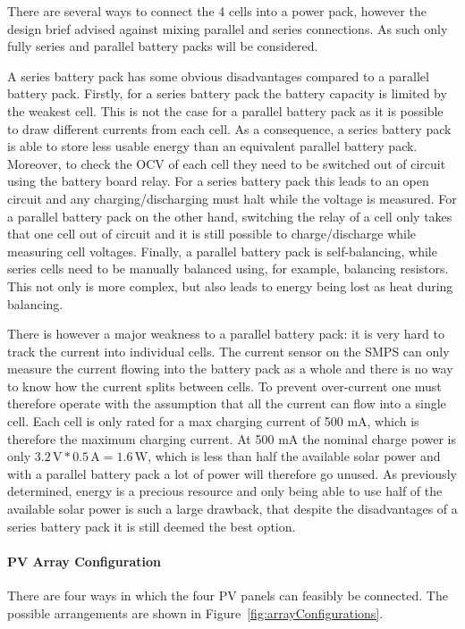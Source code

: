 \documentclass[a4paper]{article}
\newcommand{\unit}[1]{\ensuremath{\, \mathrm{#1}}}
\begin{document}
There are several ways to connect the 4 cells into a power pack, 
however the design brief advised against mixing parallel and series 
connections\cite{energyBrief}. As such only fully series and parallel 
battery packs will be considered. 

A series battery pack has some obvious disadvantages compared to 
a parallel battery pack. Firstly, for a series battery pack the 
battery capacity is limited by the weakest cell. This is not the 
case for a parallel battery pack as it is possible to draw different 
currents from each cell. As a consequence, a series battery pack
is able to store less usable energy than an equivalent parallel 
battery pack. Moreover, to check the OCV of each cell they need 
to be switched out of circuit using the battery board relay. 
For a series battery pack this leads to an open circuit and 
any charging/discharging must halt while the voltage is measured. 
For a parallel battery pack on the other hand, switching the 
relay of a cell only takes that one cell out of circuit and it 
is still possible to charge/discharge while measuring cell 
voltages. Finally, a parallel battery pack is 
self-balancing\cite{batteryBalancing}, while series cells 
need to be manually balanced using, for example, balancing 
resistors. This not only is more complex, but also leads to 
energy being lost as heat during balancing.

There is however a major weakness to a parallel battery pack: it is 
very hard to track the current into individual cells. The current 
sensor on the SMPS can only measure the current flowing into the 
battery pack as a whole and there is no way to know how the 
current splits between cells. To prevent over-current one must 
therefore operate with the assumption that all the current can 
flow into a single cell. Each cell is only rated for a max charging 
current of 500 mA\cite{batteryDatasheet}, which is therefore the 
maximum charging current. At 500 mA the nominal charge power is 
only \(3.2 \unit{V} * 0.5 \unit{A} = 1.6 \unit{W} \), which is 
less than half the available solar power and with a parallel 
battery pack a lot of power will therefore go unused. As 
previously determined, energy is a precious resource and only 
being able to use half of the available solar power is such a 
large drawback, that despite the disadvantages of a series battery 
pack it is still deemed the best option.

\paragraph*{PV Array Configuration}
\vspace{-6pt}
There are four ways in which the four PV panels can feasibly be connected. 
The possible arrangements are shown in Figure~\ref{fig:arrayConfigurations}.
\end{document}
